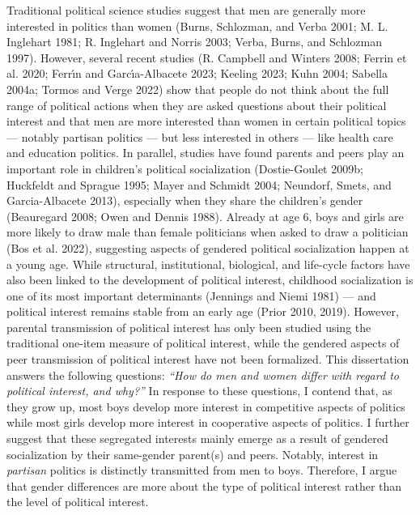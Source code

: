\documentclass[
  letterpaper,
  DIV=11,
  numbers=noendperiod]{scrreprt}
\begin{document}
Traditional political science studies suggest that men are generally
more interested in politics than women (Burns, Schlozman, and Verba
2001; M. L. Inglehart 1981; R. Inglehart and Norris 2003; Verba, Burns,
and Schlozman 1997). However, several recent studies (R. Campbell and
Winters 2008; Ferrin et al. 2020; Ferrı́n and Garcı́a-Albacete 2023;
Keeling 2023; Kuhn 2004; Sabella 2004a; Tormos and Verge 2022) show that
people do not think about the full range of political actions when they
are asked questions about their political interest and that men are more
interested than women in certain political topics --- notably partisan
politics --- but less interested in others --- like health care and
education politics. In parallel, studies have found parents and peers
play an important role in children's political socialization
(Dostie-Goulet 2009b; Huckfeldt and Sprague 1995; Mayer and Schmidt
2004; Neundorf, Smets, and Garcia-Albacete 2013), especially when they
share the children's gender (Beauregard 2008; Owen and Dennis 1988).
Already at age 6, boys and girls are more likely to draw male than
female politicians when asked to draw a politician (Bos et al. 2022),
suggesting aspects of gendered political socialization happen at a young
age. While structural, institutional, biological, and life-cycle factors
have also been linked to the development of political interest,
childhood socialization is one of its most important determinants
(Jennings and Niemi 1981) --- and political interest remains stable from
an early age (Prior 2010, 2019). However, parental transmission of
political interest has only been studied using the traditional one-item
measure of political interest, while the gendered aspects of peer
transmission of political interest have not been formalized. This
dissertation answers the following questions: \emph{``How do men and
women differ with regard to political interest, and why?''} In response
to these questions, I contend that, as they grow up, most boys develop
more interest in competitive aspects of politics while most girls
develop more interest in cooperative aspects of politics. I further
suggest that these segregated interests mainly emerge as a result of
gendered socialization by their same-gender parent(s) and peers.
Notably, interest in \emph{partisan} politics is distinctly transmitted
from men to boys. Therefore, I argue that gender differences are more
about the type of political interest rather than the level of political
interest.
\end{document}
